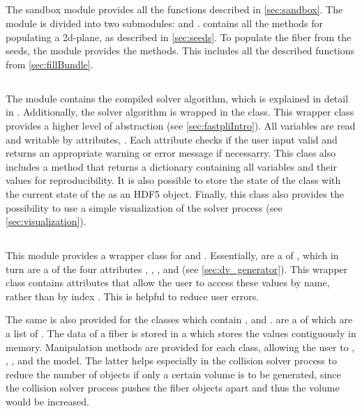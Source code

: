 \subsection{}
%
The sandbox module provides all the functions described in \cref{sec:sandbox}.
The module is divided into two submodules:  and .
 contains all the methods for populating a 2d-plane, as described in \cref{sec:seeds}.
To populate the fiber from the seeds, the  module provides the methods.
This includes all the described functions from \cref{sec:fillBundle}.
%
%
%
\subsection{}
%
The module  contains the compiled solver algorithm, which is explained in detail in .
Additionally, the solver algorithm is wrapped in the  class.
This wrapper class provides a higher level of abstraction (see \cref{sec:fastpliIntro}).
All variables are read and writable by attributes, \eg{} .
Each attribute checks if the user input valid and returns an appropriate warning or error message if necessarry.
This class also includes a  method that returns a \python{} dictionary containing all variables and their values for reproducibility.
It is also possible to store the state of the class with the current state of the  as an \ac{HDF5} object.
Finally, this class also provides the possibility to use a simple visualization of the solver process (see \cref{sec:visualization}).
%
%
%
\subsection{}
%
This module provides a wrapper class for  and .
Essentially,  are a  of , which in turn are a  of the four attributes , , , and  (see \cref{sec:dv_generator}).
This wrapper class contains attributes that allow the user to access these values by name, rather than by index  \code{[i]}.
This is helpful to reduce user errors.
\par
% 
The same is also provided for the classes  which contain ,  and .
 are a  of  which are a list of .
The data of a fiber is stored in a  which stores the values contiguously in memory.
Manipulation methods are provided for each class, allowing the user to , , , and  the model.
The latter helps especially in the collision solver process to reduce the number of objects if only a certain volume is to be generated, since the collision solver process pushes the fiber objects apart and thus the volume would be increased.
%
%
%

